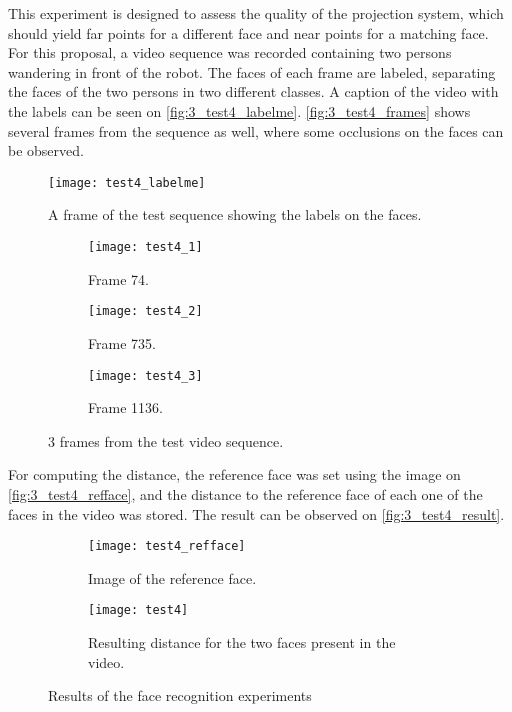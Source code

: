 This experiment is designed to assess the quality of the projection system, which should yield far points for a different face and near points for a matching face. For this proposal, a video sequence was recorded containing two persons wandering in front of the robot. The faces of each frame are labeled, separating the faces of the two persons in two different classes. A caption of the video with the labels can be seen on \autoref{fig:3_test4_labelme}. \autoref{fig:3_test4_frames} shows several frames from the sequence as well, where some occlusions on the faces can be observed. 

\begin{figure}[h]
	\centering
	\texttt{[image: test4\_labelme]}
	\caption{A frame of the test sequence showing the labels on the faces.}
	\label{fig:3_test4_labelme}
\end{figure}



\begin{figure}[h]
	\centering
	\begin{subfigure}[b]{0.3\linewidth}
		\centering
		\texttt{[image: test4\_1]}
		\caption{Frame 74.}
	\end{subfigure}
	\begin{subfigure}[b]{0.3\linewidth}
		\centering
		\texttt{[image: test4\_2]}
		\caption{Frame 735.}
	\end{subfigure}
	\begin{subfigure}[b]{0.3\linewidth}
		\centering
		\texttt{[image: test4\_3]}
		\caption{Frame 1136.}
	\end{subfigure}
	\caption{3 frames from the test video sequence.}
	\label{fig:3_test4_frames}
\end{figure}


For computing the distance, the reference face was set using the image on \autoref{fig:3_test4_refface}, and the distance to the reference face of each one of the faces in the video was stored. The result can be observed on \autoref{fig:3_test4_result}.


\begin{figure}[h]
	\centering
	\begin{subfigure}[b]{0.25\linewidth}
		\centering
		\texttt{[image: test4\_refface]}
		\caption{Image of the reference face.}
		\label{fig:3_test4_refface}
	\end{subfigure}
	\begin{subfigure}[b]{0.7\linewidth}
		\centering
		\texttt{[image: test4]}
		\caption{Resulting distance for the two faces present in the video.}
		\label{fig:3_test4_result}
	\end{subfigure}
	\caption{Results of the face recognition experiments}
	\label{fig:3_test4}
\end{figure}

